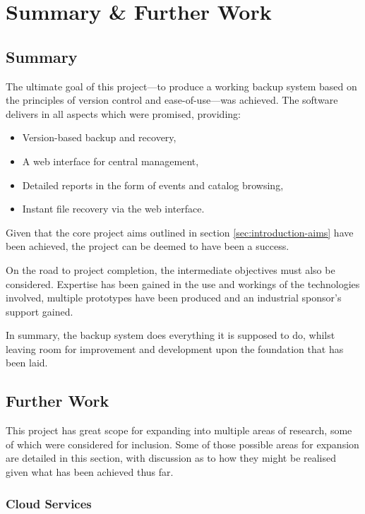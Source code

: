 \chapter{Summary \& Further Work}
\label{chap:summary}

\section{Summary}

The ultimate goal of this project---to produce a working backup system based on
the principles of version control and ease-of-use---was achieved. The software
delivers in all aspects which were promised, providing:

\begin{itemize}
    \item Version-based backup and recovery,
    \item A web interface for central management,
    \item Detailed reports in the form of events and catalog browsing,
    \item Instant file recovery via the web interface.
\end{itemize}

Given that the core project aims outlined in section
\ref{sec:introduction-aims} have been achieved, the project can be deemed to
have been a success.

On the road to project completion, the intermediate objectives must also be
considered. Expertise has been gained in the use and workings of the
technologies involved, multiple prototypes have been produced and an industrial
sponsor's support gained.

In summary, the backup system does everything it is supposed to do, whilst
leaving room for improvement and development upon the foundation that has been
laid.

\section{Further Work}
\label{sec:summary-further}

This project has great scope for expanding into multiple areas of research,
some of which were considered for inclusion. Some of those possible areas for
expansion are detailed in this section, with discussion as to how they might be
realised given what has been achieved thus far.

\subsection{Cloud Services}

